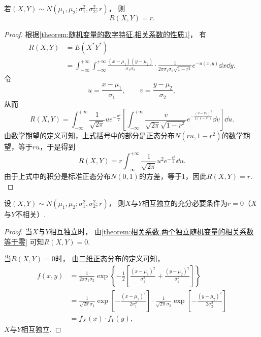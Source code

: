 \begin{theorem}\label{theorem:正态分布与自然指数分布族.性质2}
若\((X,Y) \sim N(\mu_1,\mu_2;\sigma_1^2,\sigma_2^2;r)\)，
则\begin{equation*}
	R(X,Y) = r.
\end{equation*}
\begin{proof}
根据\cref{theorem:随机变量的数字特征.相关系数的性质1}，
有\begin{align*}
	R(X,Y)
	&= E(X^* Y^*) \\
	&= \int_{-\infty}^{+\infty} \int_{-\infty}^{+\infty}
		\frac{(x-\mu_1)(y-\mu_2)}{\sigma_1 \sigma_2}
		\cdot
		\frac{1}{2\pi \sigma_1 \sigma_2 \sqrt{1-r^2}}
		e^{-u(x,y)}
		\dd{x} \dd{y}.
\end{align*}
{%
\def\u{u}%
\def\v{v}%
\def\intx{\int_{-\infty}^{+\infty}}%
令\begin{equation*}
	\u = \frac{x-\mu_1}{\sigma_1},
	\qquad
	\v = \frac{y-\mu_2}{\sigma_2},
\end{equation*}从而\begin{equation*}
	R(X,Y)
	= \intx
		\frac{1}{\sqrt{2\pi}}
		\u e^{-\frac{\u^2}{2}}
		\left[
			\intx
			\frac{\v}{\sqrt{2\pi} \sqrt{1-r^2}}
			e^{-\frac{(\v-r\u)^2}{2(1-r^2)}}
			\dd{\v}
		\right]
		\dd{\u}.
\end{equation*}
由数学期望的定义可知，上式括号中的部分是正态分布\(N(r\u,1-r^2)\)的数学期望，等于\(r\u\)，于是得到\begin{equation*}
	R(X,Y)
	= r \intx \frac{1}{\sqrt{2\pi}} \u^2 e^{-\frac{\u^2}{2}} \dd{\u}.
\end{equation*}
由于上式中的积分是标准正态分布\(N(0,1)\)的方差，等于\(1\)，因此\(R(X,Y) = r\).
}%
\end{proof}
\end{theorem}
\begin{corollary}\label{theorem:正态分布与自然指数分布族.性质3}
设\((X,Y) \sim N(\mu_1,\mu_2;\sigma_1^2,\sigma_2^2;r)\)，
则\(X\)与\(Y\)相互独立的充分必要条件为\(r=0\)（\(X\)与\(Y\)不相关）.
\begin{proof}
当\(X\)与\(Y\)相互独立时，
由\cref{theorem:相关系数.两个独立随机变量的相关系数等于零}
可知\(R(X,Y)=0\).

当\(R(X,Y)=0\)时，
由二维正态分布的定义可知，
\begin{align*}
	f(x,y)
	&= \frac1{2\pi\sigma_1\sigma_2} \exp\left\{
		-\frac12 \left[
			\frac{(x-\mu_1)^2}{\sigma_1^2}
			+\frac{(y-\mu_2)^2}{\sigma_2^2}
		\right]
	\right\} \\
	&= \frac1{\sqrt{2\pi}\sigma_1} \exp[-\frac{(x-\mu_1)^2}{2\sigma_1^2}]
		\cdot \frac1{\sqrt{2\pi}\sigma_2} \exp[-\frac{(y-\mu_2)^2}{2\sigma_2^2}] \\
	&= f_X(x) \cdot f_Y(y),
\end{align*}
\(X\)与\(Y\)相互独立.
\end{proof}
\end{corollary}

